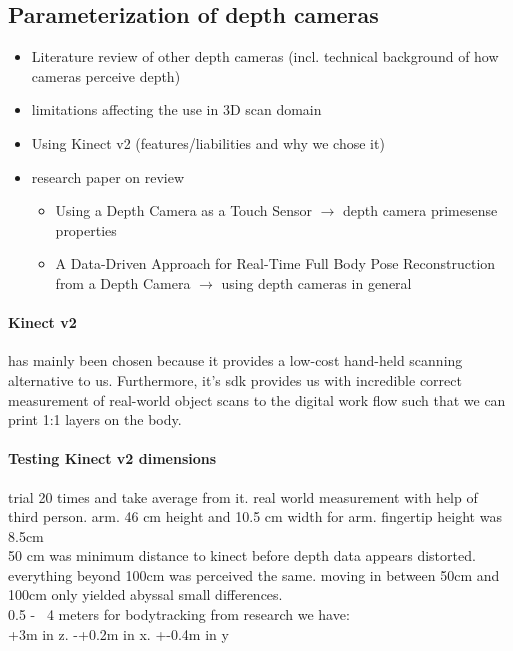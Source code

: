 \subsection{Parameterization of depth cameras}
\begin{itemize}
\item Literature review of other depth cameras (incl. technical background of how cameras perceive depth)
\item limitations affecting the use in 3D scan domain
\item Using Kinect v2 (features/liabilities and why we chose it)
\item research paper on review
\begin{itemize}
\item Using a Depth Camera as a Touch Sensor $\rightarrow$ depth camera primesense properties
\item A Data-Driven Approach for Real-Time Full Body Pose Reconstruction
from a Depth Camera  $\rightarrow$ using depth cameras in general
\end{itemize}
\end{itemize}

\paragraph{Kinect v2}
has mainly been chosen because it provides a low-cost hand-held scanning alternative to us. Furthermore, it's sdk provides us with incredible correct measurement of real-world object scans to the digital work flow such that we can print 1:1 layers on the body.

\paragraph{Testing Kinect v2 dimensions}
trial 20 times and take average from it. 
real world measurement with help of third person. arm. 46 cm height and 10.5 cm width for arm. fingertip height was 8.5cm\\

50 cm was minimum distance to kinect before depth data appears distorted. everything beyond 100cm was perceived the same. moving in between 50cm and 100cm only yielded abyssal small differences. \\[0.125in]
0.5 - ~4 meters for bodytracking
from research we have:\\ +3m in z.  	 -+0.2m in x. 	+-0.4m in y \\[0.125in]

